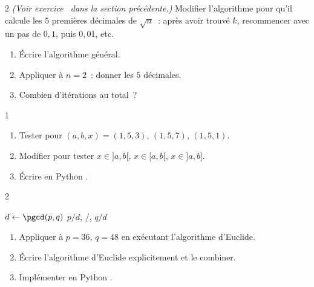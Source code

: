 \begin{exo}{2}
\emph{(Voir exercice \logicoalgo\ dans la section pr\'ec\'edente.)}
Modifier l'algorithme pour qu'il calcule les $5$ premi\`eres d\'ecimales
de $\sqrt{n}$~: apr\`es avoir trouv\'e $k$, recommencer avec un pas de $0{,}1$,
puis $0{,}01$, etc.
\begin{enumerate}
  \item \'Ecrire l'algorithme g\'en\'eral.
  \item Appliquer \`a $n=2$~: donner les $5$ d\'ecimales.
  \item Combien d'it\'erations au total~?
\end{enumerate}
\end{exo}

\begin{exo}{1}

\begin{algorithm}[H]
\caption{Test d'appartenance \`a $[a,b]$}
\Sinon{\Retourner \Faux\;}
\end{algorithm}

\begin{enumerate}
  \item Tester pour $(a,b,x)=(1,5,3)$, $(1,5,7)$, $(1,5,1)$.
  \item Modifier pour tester $x\in]a,b[$, $x\in[a,b[$, $x\in]a,b]$.
  \item \'Ecrire en Python \computer.
\end{enumerate}
\end{exo}

\begin{exo}{2}

\begin{algorithm}[H]
\caption{Simplification de $p/q$}
$d \leftarrow \pgcd(p,q)$
\Afficher $p/d$, \og/\fg, $q/d$\;
\end{algorithm}

\begin{enumerate}
  \item Appliquer \`a $p=36$, $q=48$ en ex\'ecutant l'algorithme d'Euclide.
  \item \'Ecrire l'algorithme d'Euclide explicitement et le combiner.
  \item Impl\'ementer en Python \computer.
\end{enumerate}
\end{exo}

